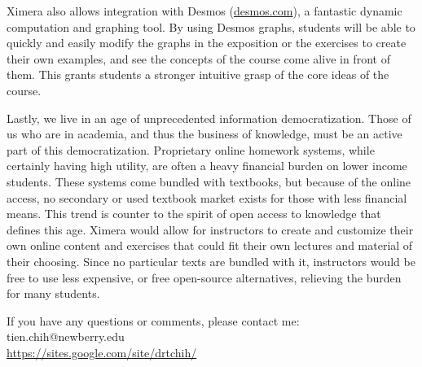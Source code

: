 \documentclass{ximera}
\begin{document}
Ximera also allows integration with Desmos (\url{desmos.com}), a fantastic dynamic computation and graphing tool.  By using Desmos graphs, students will be able to quickly and easily modify the graphs in the exposition or the exercises to create their own examples, and see the concepts of the course come alive in front of them.  This grants students a stronger intuitive grasp of the core ideas of the course.

Lastly, we live  in an age of unprecedented information democratization.  Those of us who are in academia, and thus the business of knowledge, must be an active part of this democratization.  Proprietary online homework systems, while certainly having high utility,  are often a heavy financial burden on lower income students.  These systems come bundled with textbooks, but because of the online access, no secondary or used textbook market exists for those with less financial means.  This trend is counter to the spirit of open access to knowledge that defines this age.  Ximera would allow for instructors to create and customize their own online content and exercises that could fit their own lectures and material of their choosing.  Since no particular texts are bundled with it, instructors would be free to use less expensive, or free open-source alternatives, relieving the burden for many students.


If you have any questions or comments, please contact me:\\
tien.chih@newberry.edu\\
\url{https://sites.google.com/site/drtchih/}
\end{document}
